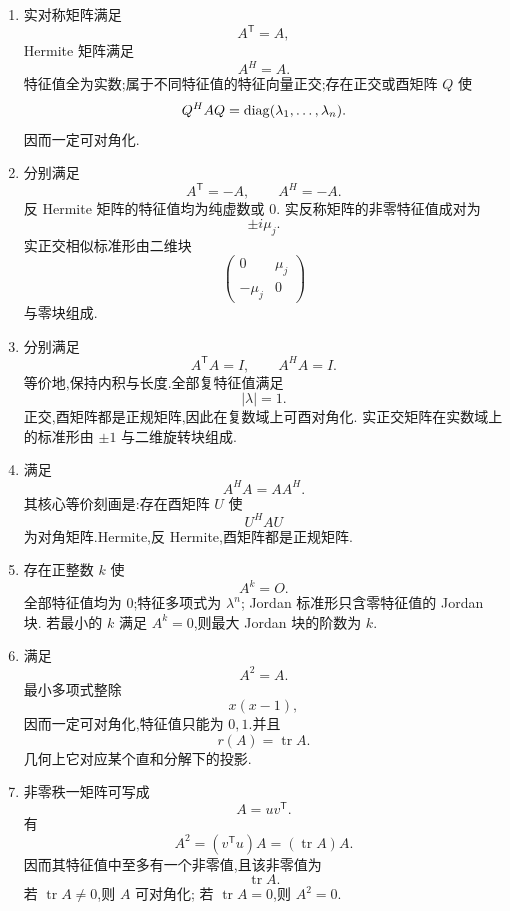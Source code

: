 \begin{solution}
\leavevmode
\begin{enumerate}
    \item {}
    实对称矩阵满足
    \[
    A^{\mathsf T}=A,
    \]
    Hermite 矩阵满足
    \[
    A^H=A.
    \]
    特征值全为实数;属于不同特征值的特征向量正交;存在正交或酉矩阵
    $Q$ 使
    \[
    Q^HAQ=\operatorname{diag}(\lambda_1,\ldots,\lambda_n).
    \]
    因而一定可对角化.

    \item {}
    分别满足
    \[
    A^{\mathsf T}=-A,
    \qquad
    A^H=-A.
    \]
    反 Hermite 矩阵的特征值均为纯虚数或 $0$.
    实反称矩阵的非零特征值成对为
    \[
    \pm i\mu_j.
    \]
    实正交相似标准形由二维块
    \[
    \begin{pmatrix}
    0&\mu_j\\
    -\mu_j&0
    \end{pmatrix}
    \]
    与零块组成.

    \item {}
    分别满足
    \[
    A^{\mathsf T}A=I,
    \qquad
    A^HA=I.
    \]
    等价地,保持内积与长度.全部复特征值满足
    \[
    |\lambda|=1.
    \]
    正交,酉矩阵都是正规矩阵,因此在复数域上可酉对角化.
    实正交矩阵在实数域上的标准形由 $\pm1$ 与二维旋转块组成.

    \item {}
    满足
    \[
    A^HA=AA^H.
    \]
    其核心等价刻画是:存在酉矩阵 $U$ 使
    \[
    U^HAU
    \]
    为对角矩阵.Hermite,反 Hermite,酉矩阵都是正规矩阵.

    \item {}
    存在正整数 $k$ 使
    \[
    A^k=O.
    \]
    全部特征值均为 $0$;特征多项式为 $\lambda^n$;
    Jordan 标准形只含零特征值的 Jordan 块.
    若最小的 $k$ 满足 $A^k=0$,则最大 Jordan 块的阶数为 $k$.

    \item {}
    满足
    \[
    A^2=A.
    \]
    最小多项式整除
    \[
    x(x-1),
    \]
    因而一定可对角化,特征值只能为 $0,1$.并且
    \[
    \boxed{r(A)=\operatorname{tr}A}.
    \]
    几何上它对应某个直和分解下的投影.

    \item {}
    非零秩一矩阵可写成
    \[
    A=uv^{\mathsf T}.
    \]
    有
    \[
    A^2=(v^{\mathsf T}u)A=(\operatorname{tr}A)A.
    \]
    因而其特征值中至多有一个非零值,且该非零值为
    \[
    \operatorname{tr}A.
    \]
    若 $\operatorname{tr}A\neq0$,则 $A$ 可对角化;
    若 $\operatorname{tr}A=0$,则 $A^2=0$.


\end{enumerate}
\end{solution}
